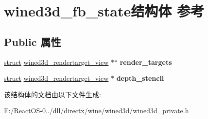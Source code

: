 \hypertarget{structwined3d__fb__state}{}\section{wined3d\+\_\+fb\+\_\+state结构体 参考}
\label{structwined3d__fb__state}
\subsection*{Public 属性}
\begin{DoxyCompactItemize}
\item 
\mbox{\label{structwined3d__fb__state_a2b6e7b1f1ca76faaa4a50cbd7f383286}} 
\hyperlink{interfacestruct}{struct} \hyperlink{structwined3d__rendertarget__view}{wined3d\+\_\+rendertarget\+\_\+view} $\ast$$\ast$ {\bfseries render\+\_\+targets}
\item 
\mbox{\label{structwined3d__fb__state_a4bca35fcfa5e6d7e653159446ae24c40}} 
\hyperlink{interfacestruct}{struct} \hyperlink{structwined3d__rendertarget__view}{wined3d\+\_\+rendertarget\+\_\+view} $\ast$ {\bfseries depth\+\_\+stencil}
\end{DoxyCompactItemize}


该结构体的文档由以下文件生成\+:\begin{DoxyCompactItemize}
\item 
E\+:/\+React\+O\+S-\/0../dll/directx/wine/wined3d/wined3d\+\_\+private.\+h\end{DoxyCompactItemize}
